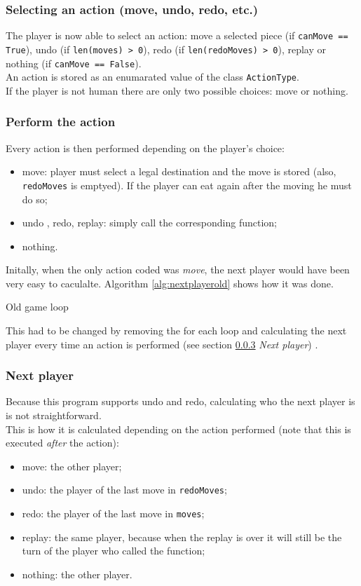\documentclass[10pt, a4paper]{article}
\begin{document}
	\subsubsection{Selecting an action (move, undo, redo, etc.)}
	The player is now able to select an action: move a selected piece (if \texttt{canMove == True}), undo (if \texttt{len(moves) > 0}), redo (if \texttt{len(redoMoves) > 0}), replay or nothing (if \texttt{canMove == False}).\\
	An action is stored as an enumarated value of the class \texttt{ActionType}.\\
	If the player is not human there are only two possible choices: move or nothing.
	
	\subsubsection{Perform the action}
	Every action is then performed depending on the player's choice:
	\begin{itemize}
		\item move: player must select a legal destination and the move is stored (also, \texttt{redoMoves} is emptyed). If the player can eat again after the moving he must do so;
		\item undo , redo, replay: simply call the corresponding function;
		\item nothing.
	\end{itemize}
	Initally, when the only action coded was \textit{move}, the next player would have been very easy to caculalte. Algorithm \ref{alg:nextplayerold} shows how it was done.
	\begin{algorithm}[h]
		\label{alg:nextplayerold}
		\caption{Old game loop}
	\end{algorithm}
	This had to be changed by removing the for each loop and calculating the next player every time an action is performed (see section \ref{subsubsec:nextplayer} \textit{Next player}) .
	
	\subsubsection{Next player}
	\label{subsubsec:nextplayer}
	Because this program supports undo and redo, calculating who the next player is is not straightforward.\\
	This is how it is calculated depending on the action performed (note that this is executed \textit{after} the action):
	\begin{itemize}
		\item move: the other player;
		\item undo: the player of the last move in \texttt{redoMoves};
		\item redo: the player of the last move in \texttt{moves};
		\item replay: the same player, because when the replay is over it will still be the turn of the player who called the function;
		\item nothing: the other player.
	\end{itemize}
\end{document}
